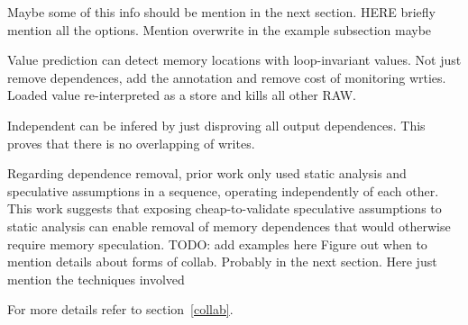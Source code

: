 Maybe some of this info should be mention in the next section.
HERE briefly mention all the options.
Mention overwrite in the example subsection maybe


Value prediction can detect memory locations with loop-invariant values.
Not just remove dependences, add the annotation and remove cost of
monitoring wrties.
Loaded value re-interpreted as a store and kills all other RAW.

Independent can be infered by just disproving all output dependences. This
proves that there is no overlapping of writes.


Regarding dependence removal, prior work only used static analysis and
speculative assumptions in a sequence, operating independently of each
other.
%
This work suggests that exposing cheap-to-validate speculative assumptions
to static analysis can enable removal of memory dependences that would
otherwise require memory speculation.
TODO: add examples here
Figure out when to mention details about forms of collab. Probably in the
next section. Here just mention the techniques involved

For more details refer to section~\ref{collab}.







